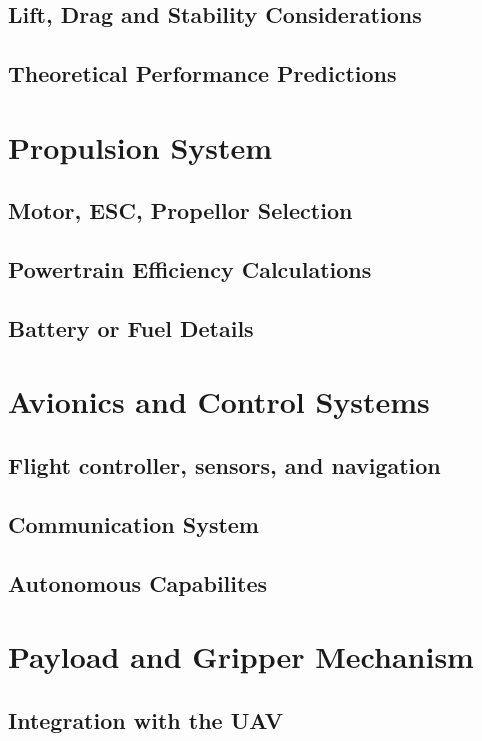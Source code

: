 \documentclass[12pt]{report}
\begin{document}
      \subsection{Lift, Drag and Stability Considerations}
      \subsection{Theoretical Performance Predictions}

    \section{Propulsion System}
      \subsection{Motor, ESC, Propellor Selection}
      \subsection{Powertrain Efficiency Calculations}
      \subsection{Battery or Fuel Details}
  
    \section{Avionics and Control Systems}
      \subsection{Flight controller, sensors, and navigation}
      \subsection{Communication System}
      \subsection{Autonomous Capabilites}

    \section{Payload and Gripper Mechanism}
      \subsection{Integration with the UAV}
\end{document}
